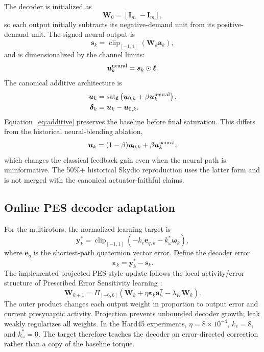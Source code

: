 \documentclass[10pt,twocolumn]{article}
\newcommand{\sat}{\operatorname{sat}}
\newcommand{\clip}{\operatorname{clip}}
\newcommand{\T}{^{\mathsf T}}
\begin{document}
The decoder is initialized as
\begin{equation}
    \bm W_0=[\bm I_m\; -\bm I_m],
\end{equation}
so each output initially subtracts its negative-demand unit from its positive-
demand unit. The signed neural output is
\begin{equation}
    \bm s_k=\clip_{[-1,1]}(\bm W_k\bm a_k),
\end{equation}
and is dimensionalized by the channel limits:
\begin{equation}
    \bm u^{\rm neural}_k=\bm s_k\odot\bm\ell.
\end{equation}
The canonical additive architecture is
\begin{align}
    \bm u_k &= \sat_{\bm\ell}\left(
    \bm u_{0,k}+\beta\bm u^{\rm neural}_k\right),
    \label{eq:additive}\\
    \bm\delta_k &= \bm u_k-\bm u_{0,k}.
\end{align}
Equation~\eqref{eq:additive} preserves the baseline before final saturation.
This differs from the historical neural-blending ablation,
\begin{equation}
    \bm u_k=(1-\beta)\bm u_{0,k}
    +\beta\bm u^{\rm neural}_k,
\end{equation}
which changes the classical feedback gain even when the neural path is
uninformative. The 50\%+ historical Skydio reproduction uses the latter form
and is not merged with the canonical actuator-faithful claims.

\subsection{Online PES decoder adaptation}

For the multirotors, the normalized learning target is
\begin{equation}
    \bm y_k^*=\clip_{[-1,1]}
    (-k_e\bm e_{q,k}-k_\omega^*\bm\omega_k),
    \label{eq:target}
\end{equation}
where $\bm e_q$ is the shortest-path quaternion vector error. Define the
decoder error
\begin{equation}
    \bm\varepsilon_k=\bm y_k^*-\bm s_k.
\end{equation}
The implemented projected PES-style update follows the local activity/error
structure of Prescribed Error Sensitivity learning \cite{bekolay2013pes}:
\begin{equation}
    \bm W_{k+1}=\Pi_{[-6,6]}\left(
    \bm W_k+\eta\bm\varepsilon_k\bm a_k\T
    -\lambda_W\bm W_k\right).
    \label{eq:pes}
\end{equation}
The outer product changes each output weight in proportion to output error and
current presynaptic activity. Projection prevents unbounded decoder growth;
leak weakly regularizes all weights. In the Hard45 experiments,
$\eta=8\times10^{-4}$, $k_e=8$, and $k_\omega^*=0$. The target therefore
teaches the decoder an error-directed correction rather than a copy of the
baseline torque.
\end{document}
